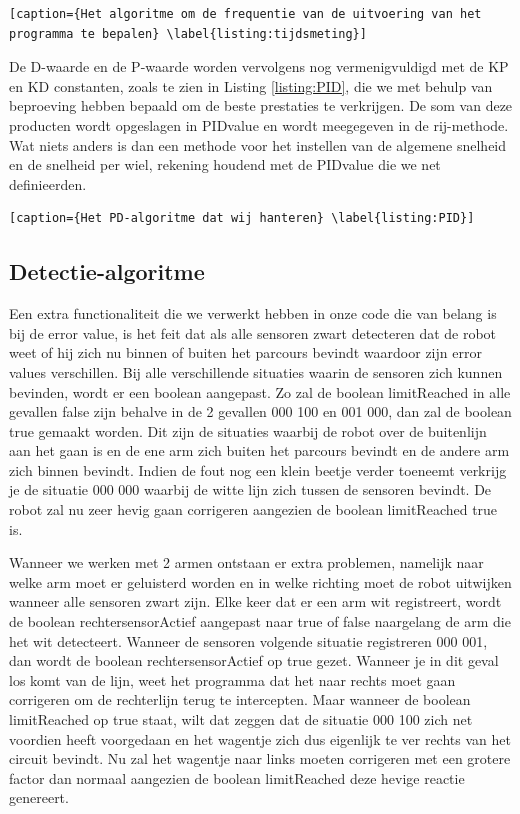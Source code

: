 
\begin{lstlisting}[caption={Het algoritme om de frequentie van de uitvoering van het programma te bepalen} \label{listing:tijdsmeting}]
\end{lstlisting}

De D-waarde en de P-waarde worden vervolgens nog vermenigvuldigd met de KP en KD constanten, zoals te zien in Listing \ref{listing:PID},  die we met behulp van beproeving hebben bepaald om de beste prestaties te verkrijgen. De som van deze producten wordt opgeslagen in PIDvalue en wordt meegegeven in de rij-methode. Wat niets anders is dan een methode voor het instellen van de algemene snelheid en de snelheid per wiel, rekening houdend met de PIDvalue die we net definieerden. 


\begin{lstlisting}[caption={Het PD-algoritme dat wij hanteren} \label{listing:PID}]
\end{lstlisting}


\subsection{Detectie-algoritme}

Een extra functionaliteit die we verwerkt hebben in onze code die van belang is bij de error value, is het feit dat als alle sensoren zwart detecteren dat de robot weet of hij zich nu binnen of buiten het parcours bevindt waardoor zijn error values verschillen. Bij alle verschillende situaties waarin de sensoren zich kunnen bevinden, wordt er een boolean aangepast. Zo zal de boolean limitReached in alle gevallen false zijn behalve in de 2 gevallen 000 100 en 001 000, dan zal de boolean true gemaakt worden. Dit zijn de situaties waarbij de robot over de buitenlijn aan het gaan is en de ene arm zich buiten het parcours bevindt en de andere arm zich binnen bevindt. Indien de fout nog een klein beetje verder toeneemt verkrijg je de situatie 000 000 waarbij de witte lijn zich tussen de sensoren bevindt. De robot zal nu zeer hevig gaan corrigeren aangezien de boolean limitReached true is. 

Wanneer we werken met 2 armen ontstaan er extra problemen, namelijk naar welke arm moet er geluisterd worden en in welke richting moet de robot uitwijken wanneer alle sensoren zwart zijn. Elke keer dat er een arm wit registreert, wordt de boolean rechtersensorActief aangepast naar true of false naargelang de arm die het wit detecteert. Wanneer de sensoren volgende situatie registreren 000 001, dan wordt de boolean rechtersensorActief op true gezet. Wanneer je in dit geval los komt van de lijn, weet het programma dat het naar rechts moet gaan corrigeren om de rechterlijn terug te intercepten. Maar wanneer de boolean limitReached op true staat, wilt dat zeggen dat de situatie 000 100 zich net voordien heeft voorgedaan en het wagentje zich dus eigenlijk te ver rechts van het circuit bevindt. Nu zal het wagentje naar links moeten corrigeren met een grotere factor dan normaal aangezien de boolean limitReached deze hevige reactie genereert.


